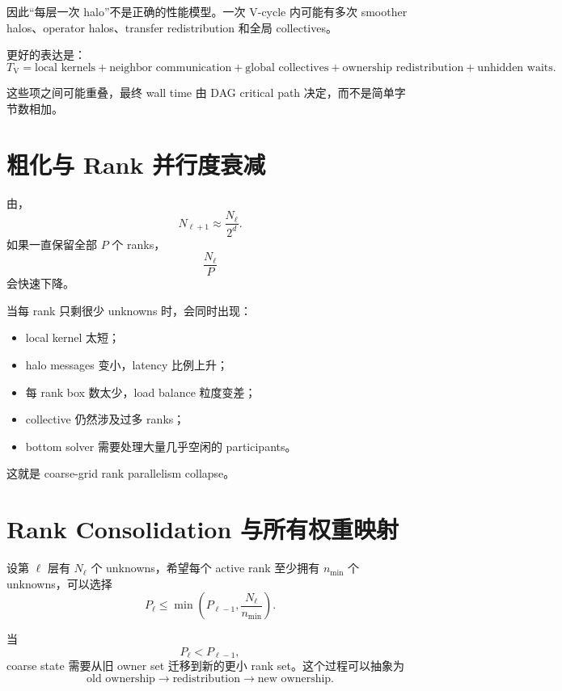 因此“每层一次 halo”不是正确的性能模型。一次 V-cycle 内可能有多次 smoother halos、operator halos、transfer redistribution 和全局 collectives。

更好的表达是：
\begin{equation}
\boxed{
T_{\mathrm{V}}
=
\text{local kernels}
+
\text{neighbor communication}
+
\text{global collectives}
+
\text{ownership redistribution}
+
\text{unhidden waits}.
}
\end{equation}

这些项之间可能重叠，最终 wall time 由 DAG critical path 决定，而不是简单字节数相加。

\section{粗化与 Rank 并行度衰减}

由，
\begin{equation}
N_{\ell+1}
\approx
\frac{N_\ell}{2^d}.
\end{equation}
如果一直保留全部 $P$ 个 ranks，
\begin{equation}
\frac{N_\ell}{P}
\end{equation}
会快速下降。

当每 rank 只剩很少 unknowns 时，会同时出现：
\begin{itemize}
\item local kernel 太短；
\item halo messages 变小，latency 比例上升；
\item 每 rank box 数太少，load balance 粒度变差；
\item collective 仍然涉及过多 ranks；
\item bottom solver 需要处理大量几乎空闲的 participants。
\end{itemize}

这就是 coarse-grid rank parallelism collapse。

\section{Rank Consolidation 与所有权重映射}

设第 $\ell$ 层有 $N_\ell$ 个 unknowns，希望每个 active rank 至少拥有 $n_{\min}$ 个 unknowns，可以选择
\begin{equation}
P_\ell
\le
\min
\left(
P_{\ell-1},
\frac{N_\ell}{n_{\min}}
\right).
\label{eq:mpi-active-ranks}
\end{equation}

当
\begin{equation}
P_\ell<P_{\ell-1},
\end{equation}
coarse state 需要从旧 owner set 迁移到新的更小 rank set。这个过程可以抽象为
\begin{equation}
\text{old ownership}
\rightarrow
\text{redistribution}
\rightarrow
\text{new ownership}.
\end{equation}

